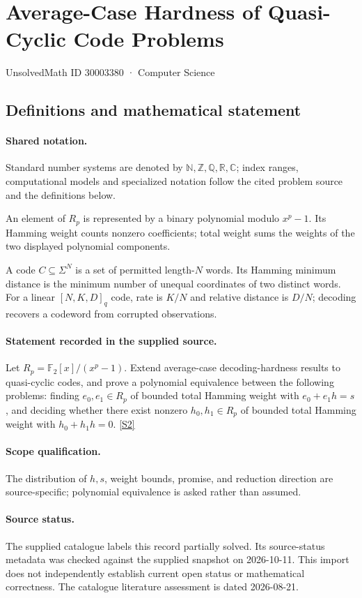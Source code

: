 \documentclass[11pt]{article}
\newcommand{\sref}[2]{\hyperlink{source:#1:#2}{[S#2]}}
\begin{document}
\setcounter{section}{30003379}
\section{Average-Case Hardness of Quasi-Cyclic Code Problems}\label{30003380}
{\small\sffamily UnsolvedMath ID 30003380 · Computer Science}
\subsection{Definitions and mathematical statement}

\paragraph{Shared notation.}Standard number systems are denoted by $\mathbb N,\mathbb Z,\mathbb Q,\mathbb R,\mathbb C$; index ranges, computational models and specialized notation follow the cited problem source and the definitions below.


An element of $R_p$ is represented by a binary polynomial modulo $x^p-1$. Its Hamming weight counts nonzero coefficients; total weight sums the weights of the two displayed polynomial components.

A code $C\subseteq\Sigma^N$ is a set of permitted length-$N$ words. Its Hamming minimum distance is the minimum number of unequal coordinates of two distinct words. For a linear $[N,K,D]_q$ code, rate is $K/N$ and relative distance is $D/N$; decoding recovers a codeword from corrupted observations.
\paragraph{Statement recorded in the supplied source.}
Let $R_p=\mathbb F_2[x]/(x^p-1)$. Extend average-case decoding-hardness results to quasi-cyclic codes, and prove a polynomial equivalence between the following problems: finding $e_0,e_1\in R_p$ of bounded total Hamming weight with $e_0+e_1h=s$, and deciding whether there exist nonzero $h_0,h_1\in R_p$ of bounded total Hamming weight with $h_0+h_1h=0$. \sref{30003380}{2}
\paragraph{Scope qualification.}
The distribution of $h,s$, weight bounds, promise, and reduction direction are source-specific; polynomial equivalence is asked rather than assumed.
\paragraph{Source status.}
The supplied catalogue labels this record partially solved. Its source-status metadata was checked against the supplied snapshot on 2026-10-11. This import does not independently establish current open status or mathematical correctness. The catalogue literature assessment is dated 2026-08-21.
\end{document}
